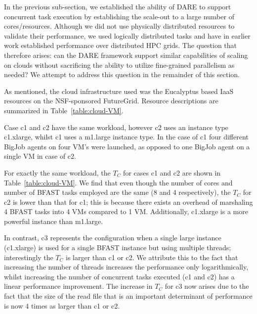 \documentclass{cpeauth}
\begin{document}
In the previous sub-section, we established the ability of DARE to
support concurrent task execution by establishing the scale-out to a
large number of cores/resources. Although we did not use physically
distributed resources to validate their performance, we used logically
distributed tasks and have in earlier work established performance
over distributed HPC grids\cite{saga-ccgrid10}.  The question that
therefore arises: can the DARE framework support similar capabilities
of scaling on clouds without sacrificing the ability to utilize
fine-grained parallelism as needed? We attempt to address this
question in the remainder of this section.

As mentioned, the cloud infrastructure used was the Eucalyptus based
IaaS resources on the NSF-sponsored FutureGrid\cite{futuregrid}.
Resource descriptions are summarized in Table~\ref{table:cloud-VM}.

Case c1 and c2 have the same workload, however c2 uses an instance
type c1.xlarge, whilst c1 uses a m1.large instance type.  In the case
of c1 four different BigJob agents on four VM's were launched, as
opposed to one BigJob agent on a single VM in case of c2.

For exactly the same workload, the $T_C$ for cases c1 and c2 are shown
in Table~\ref{table:cloud-VM}. We find that even though the number of
cores and number of BFAST tasks employed are the same (8 and 4
respectively), the $T_C$ for c2 is lower than that for c1; this is
because there exists an overhead of marshaling 4 BFAST tasks into 4
VMs compared to 1 VM.  Additionally, c1.xlarge is a more powerful
instance than m1.large. 

In contrast, c3 represents the configuration when a single large
instance (c1.xlarge) is used for a single BFAST instance but using
multiple threads; interestingly the $T_C$ is larger than c1 or c2.  We
attribute this to the fact that increasing the number of threads
increases the performance only logarithmically, whilst increasing the
number of concurrent tasks executed (c1 and c2) has a linear
performance improvement. The increase in $T_C$ for c3 now arises
due to the fact that the size of the read file that is
an important determinant of performance is now 4 times as larger
than c1 or c2.


\end{document}
